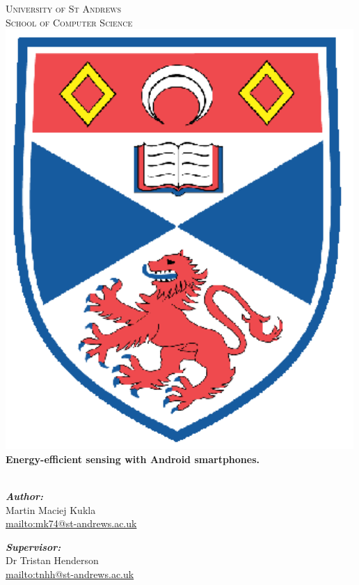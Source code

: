 \begin{titlepage}

\begin{center}

\vfill

\textsc{\Large University of St Andrews \\ School of Computer Science}\\[1.5cm]


\includegraphics[scale=0.5]{crest}
\vfill
\HRule \\[0.4cm]
{\bfseries \huge Energy-efficient sensing with Android smartphones.}\\[0.4cm]

\HRule \\[1.5cm]



\begin{minipage}{0.4\textwidth}
\begin{flushleft} \large
\emph{\textbf{Author:}} \\
Martin Maciej Kukla\\
\small \url{mailto:mk74@st-andrews.ac.uk}\\
\end{flushleft}
\end{minipage}
\begin{minipage}{0.4\textwidth}
\begin{flushright} \large
\emph{\textbf{Supervisor:}} \\
Dr Tristan Henderson\\
\small \url{mailto:tnhh@st-andrews.ac.uk}\\


\end{flushright}
\end{minipage}
\end{center}
\end{titlepage}
